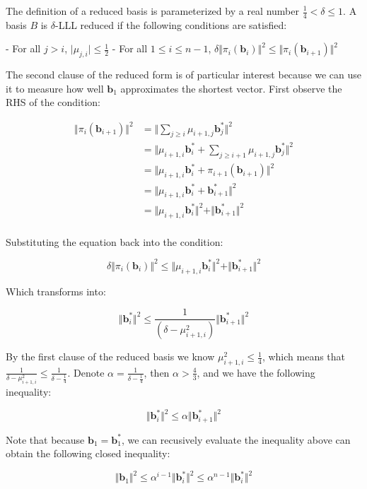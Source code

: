 The definition of a reduced basis is parameterized by a real number $\frac{1}{4} < \delta \leq 1$. A basis $B$ is $\delta$-LLL reduced if the following conditions are satisfied:

- For all $j > i$, $\vert\mu_{j, i}\vert \leq \frac{1}{2}$
- For all $1 \leq i \leq n-1$, $\delta\Vert \pi_i(\mathbf{b}_i)\Vert^2 \leq \Vert\pi_i(\mathbf{b}_{i+1})\Vert^2$

The second clause of the reduced form is of particular interest because we can use it to measure how well $\mathbf{b}_1$ approximates the shortest vector. First observe the RHS of the condition:

$$
\begin{aligned}
\Vert \pi_i(\mathbf{b}_{i+1})\Vert^2 &= \Vert \sum_{j\geq i}\mu_{i+1, j}\mathbf{b}_j^\ast\Vert^2 \\
&= \Vert \mu_{i+1, i}\mathbf{b}_i^\ast + \sum_{j\geq i+1}\mu_{i+1, j}\mathbf{b}_j^\ast\Vert^2 \\
&= \Vert \mu_{i+1, i}\mathbf{b}_i^\ast + \pi_{i+1}(\mathbf{b}_{i+1}) \Vert^2 \\
&= \Vert \mu_{i+1, i}\mathbf{b}_i^\ast + \mathbf{b}_{i+1}^\ast \Vert^2 \\
&= \Vert \mu_{i+1, i}\mathbf{b}_i^\ast \Vert^2 + \Vert \mathbf{b}_{i+1}^\ast \Vert^2 \\
\end{aligned}
$$

Substituting the equation back into the condition:

$$
\delta\Vert \pi_i(\mathbf{b}_i)\Vert^2 \leq \Vert \mu_{i+1, i}\mathbf{b}_i^\ast \Vert^2 + \Vert \mathbf{b}_{i+1}^\ast \Vert^2
$$

Which transforms into:

$$
\Vert \mathbf{b}_i^\ast \Vert^2 \leq \frac{1}{(\delta - \mu_{i+1, i}^2)} \Vert \mathbf{b}_{i+1}^\ast \Vert^2
$$

By the first clause of the reduced basis we know $\mu_{i+1, i}^2 \leq \frac{1}{4}$, which means that $\frac{1}{\delta - \mu_{i+1, i}^2} \leq \frac{1}{\delta - \frac{1}{4}}$. Denote $\alpha = \frac{1}{\delta - \frac{1}{4}}$, then $\alpha > \frac{4}{3}$, and we have the following inequality:

$$
\Vert \mathbf{b}_i^\ast \Vert^2 \leq \alpha \Vert \mathbf{b}_{i+1}^\ast \Vert^2
$$

Note that because $\mathbf{b}_1 = \mathbf{b}_1^\ast$, we can recusively evaluate the inequality above can obtain the following closed inequality:

$$
\Vert \mathbf{b}_1 \Vert^2 \leq \alpha^{i-1} \Vert \mathbf{b}_{i}^\ast \Vert^2 \leq \alpha^{n-1} \Vert \mathbf{b}_{i}^\ast \Vert^2
$$

